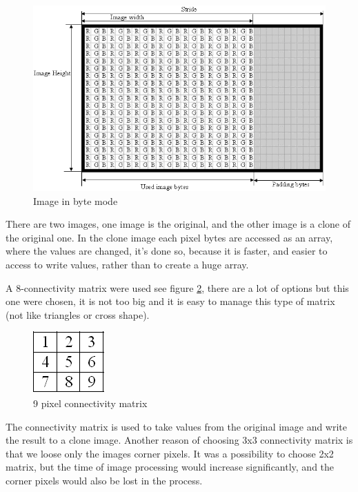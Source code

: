 \begin{figure}[H]
  \centering
  \includegraphics[scale= 0.6]{source/imagebyte.png}
  \caption{Image in byte mode}
  \label{fig:imagebyte}
\end{figure}

There are two images, one image is the original, and the other image is a clone of the original one. In the clone image each pixel bytes are accessed as an array, where the values are changed, it's done
so, because it is faster, and easier to access to write values, rather than to create a huge array.

A 8-connectivity matrix were used see figure \ref{fig:pixelmatrix}, there are a lot of options but this one were chosen, it is not too big and it is easy to manage this type of matrix (not like triangles or cross shape).  

\begin{figure}[H]
  \centering
  \includegraphics[scale= 0.6]{source/pixelmatrix.png}
  \caption{9 pixel connectivity matrix}
  \label{fig:pixelmatrix}
\end{figure}

The connectivity matrix is used to take values from the original image and write the result to a clone image. Another reason of choosing 3x3 connectivity matrix is that we loose only the images corner pixels. It was a possibility to choose 2x2 matrix, but the time of image processing would increase significantly, and the corner pixels would also be lost in the process.

